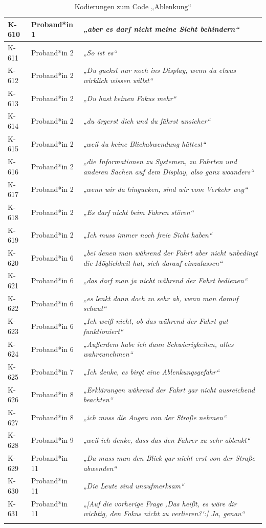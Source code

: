 {\begin{xltabular}{\textwidth}{
    |P{0.10\textwidth}
    |P{0.17\textwidth}
    |Y|
}
K-610 & Proband*in 1 & \textit{„aber es darf nicht meine Sicht behindern“} \\
\hline
K-611 & Proband*in 2 & \textit{„So ist es“} \\
\hline
K-612 & Proband*in 2 & \textit{„Du guckst nur noch ins Display, wenn du etwas wirklich wissen willst“} \\
\hline
K-613 & Proband*in 2 & \textit{„Du hast keinen Fokus mehr“} \\
\hline
K-614 & Proband*in 2 & \textit{„du ärgerst dich und du fährst unsicher“} \\
\hline
K-615 & Proband*in 2 & \textit{„weil du keine Blickabwendung hättest“} \\
\hline
K-616 & Proband*in 2 & \textit{„die Informationen zu Systemen, zu Fahrten und anderen Sachen auf dem Display, also ganz woanders“} \\
\hline
K-617 & Proband*in 2 & \textit{„wenn wir da hingucken, sind wir vom Verkehr weg“} \\
\hline
K-618 & Proband*in 2 & \textit{„Es darf nicht beim Fahren stören“} \\
\hline
K-619 & Proband*in 2 & \textit{„Ich muss immer noch freie Sicht haben“} \\
\hline
K-620 & Proband*in 6 & \textit{„bei denen man während der Fahrt aber nicht unbedingt die Möglichkeit hat, sich darauf einzulassen“} \\
\hline
K-621 & Proband*in 6 & \textit{„das darf man ja nicht während der Fahrt bedienen“} \\
\hline
K-622 & Proband*in 6 & \textit{„es lenkt dann doch zu sehr ab, wenn man darauf schaut“} \\
\hline
K-623 & Proband*in 6 & \textit{„Ich weiß nicht, ob das während der Fahrt gut funktioniert“} \\
\hline
K-624 & Proband*in 6 & \textit{„Außerdem habe ich dann Schwierigkeiten, alles wahrzunehmen“} \\
\hline
K-625 & Proband*in 7 & \textit{„Ich denke, es birgt eine Ablenkungsgefahr“} \\
\hline
K-626 & Proband*in 8 & \textit{„Erklärungen während der Fahrt gar nicht ausreichend beachten“} \\
\hline
K-627 & Proband*in 8 & \textit{„ich muss die Augen von der Straße nehmen“} \\
\hline
K-628 & Proband*in 9 & \textit{„weil ich denke, dass das den Fahrer zu sehr ablenkt“} \\
\hline
K-629 & Proband*in 11 & \textit{„Da muss man den Blick gar nicht erst von der Straße abwenden“} \\
\hline
K-630 & Proband*in 11 & \textit{„Die Leute sind unaufmerksam“} \\
\hline
K-631 & Proband*in 11 & \textit{„[Auf die vorherige Frage ‚Das heißt, es wäre dir wichtig, den Fokus nicht zu verlieren?‘:] Ja, genau“} \\
\hline
\caption{Kodierungen zum Code „Ablenkung“}\label{tab:kodiernachweis-ablenkung}\\
\end{xltabular}
}


